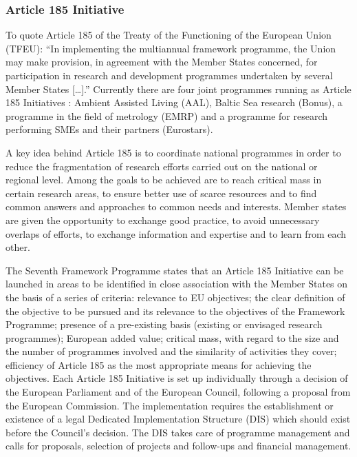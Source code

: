 \documentclass[10pt, plain]{../../metanetpaper}
\begin{document}
\begin{multicols}{2}
\subsubsection{Article 185 Initiative}
\label{sec:article-185-init}

To quote Article 185 of the Treaty of the Functioning of the European Union (TFEU): ``In implementing the multiannual framework programme, the Union may make provision, in agreement with the Member States concerned, for participation in research and development programmes undertaken by several Member States [\dots].''  Currently there are four joint programmes running as Article 185 Initiatives \cite{A185}: Ambient Assisted Living (AAL), Baltic Sea research (Bonus), a programme in the field of metrology (EMRP) and a programme for research performing SMEs and their partners (Eurostars).

A key idea behind Article 185 is to coordinate national programmes in order to reduce the fragmentation of research efforts carried out on the national or regional level. Among the goals to be achieved are to reach critical mass in certain research areas, to ensure better use of scarce resources and to find common answers and approaches to common needs and interests. Member states are given the opportunity to exchange good practice, to avoid unnecessary overlaps of efforts, to exchange information and expertise and to learn from each other.

The Seventh Framework Programme states that an Article 185 Initiative can be launched in areas to be identified in close association with the Member States on the basis of a series of criteria: relevance to EU objectives; the clear definition of the objective to be pursued and its relevance to the objectives of the Framework Programme; presence of a pre-existing basis (existing or envisaged research programmes); European added value; critical mass, with regard to the size and the number of programmes involved and the similarity of activities they cover; efficiency of Article 185 as the most appropriate means for achieving the objectives. Each Article 185 Initiative is set up individually through a decision of the European Parliament and of the European Council, following a proposal from the European Commission. The implementation requires the establishment or existence of a legal Dedicated Implementation Structure (DIS) which should exist before the Council's decision. The DIS takes care of programme management and calls for proposals, selection of projects and follow-ups and financial management.


\end{multicols}
\end{document}
